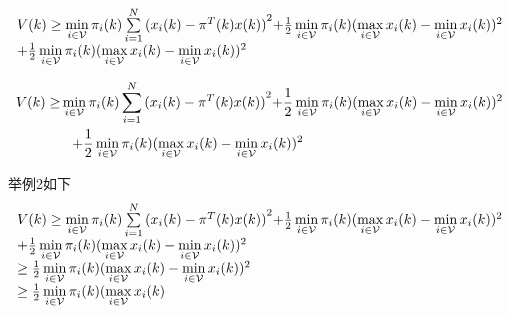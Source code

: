 \documentclass[master]{hdu-thesis}
\begin{document}
\[\begin{array}{l}
V(k) \ge \mathop {\min }\limits_{i \in {\cal V}} {\pi _i}(k)\sum\limits_{i = 1}^N {{{({x_i}(k) - {\pi ^T}(k)x(k))}^2}} {\rm{ + }}\frac{1}{2}\mathop {\min }\limits_{i \in {\cal V}} {\pi _i}(k){(\mathop {\max }\limits_{i \in {\cal V}} {x_i}(k) - \mathop {\min }\limits_{i \in {\cal V}} {x_i}(k))^2}\\
{\rm{ + }}\frac{1}{2}\mathop {\min }\limits_{i \in {\cal V}} {\pi _i}(k){(\mathop {\max }\limits_{i \in {\cal V}} {x_i}(k) - \mathop {\min }\limits_{i \in {\cal V}} {x_i}(k))^2}
\end{array}\]

\begin{equation}\label{system3}
  \begin{split}
V(k) \ge& \mathop {\min }\limits_{i \in {\cal V}} {\pi _i}(k)\sum\limits_{i = 1}^N {{{({x_i}(k) - {\pi ^T}(k)x(k))}^2}} {\rm{ + }}\frac{1}{2}\mathop {\min }\limits_{i \in {\cal V}} {\pi _i}(k){(\mathop {\max }\limits_{i \in {\cal V}} {x_i}(k) - \mathop {\min }\limits_{i \in {\cal V}} {x_i}(k))^2}\\
&\hspace{0.3cm}{\rm{ + }}\frac{1}{2}\mathop {\min }\limits_{i \in {\cal V}} {\pi _i}(k){(\mathop {\max }\limits_{i \in {\cal V}} {x_i}(k) - \mathop {\min }\limits_{i \in {\cal V}} {x_i}(k))^2}
  \end{split}
\end{equation}

举例2如下
\[\begin{array}{l}
V(k) \ge \mathop {\min }\limits_{i \in {\cal V}} {\pi _i}(k)\sum\limits_{i = 1}^N {{{({x_i}(k) - {\pi ^T}(k)x(k))}^2}} {\rm{ + }}\frac{1}{2}\mathop {\min }\limits_{i \in {\cal V}} {\pi _i}(k){(\mathop {\max }\limits_{i \in {\cal V}} {x_i}(k) - \mathop {\min }\limits_{i \in {\cal V}} {x_i}(k))^2}\\
{\rm{ + }}\frac{1}{2}\mathop {\min }\limits_{i \in {\cal V}} {\pi _i}(k){(\mathop {\max }\limits_{i \in {\cal V}} {x_i}(k) - \mathop {\min }\limits_{i \in {\cal V}} {x_i}(k))^2}\\
 \ge \frac{1}{2}\mathop {\min }\limits_{i \in {\cal V}} {\pi _i}(k){(\mathop {\max }\limits_{i \in {\cal V}} {x_i}(k) - \mathop {\min }\limits_{i \in {\cal V}} {x_i}(k))^2}\\
 \ge \frac{1}{2}\mathop {\min }\limits_{i \in {\cal V}} {\pi _i}(k)(\mathop {\max }\limits_{i \in {\cal V}} {x_i}(k)
\end{array}\]
\end{document}
